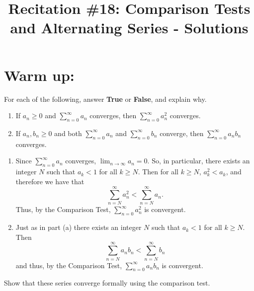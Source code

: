 \documentclass[noinstructornotes]{ximera}
\title{Recitation \#18: Comparison Tests and Alternating Series - Solutions}
\begin{document}
\begin{abstract}		\end{abstract}
\maketitle



\section{Warm up:}
For each of the following, answer {\bf True} or {\bf False}, and explain why.
	\begin{enumerate}
	
	\item  If $a_n \geq 0$ and $\sum_{n=0}^\infty a_n$ converges, then $\sum_{n=0}^\infty a_n^2$ converges.
	
	\item  If $a_n, b_n \geq 0$ and both $\sum_{n=0}^\infty a_n$ and $\sum_{n=0}^\infty b_n$ converge, then $\sum_{n=0}^\infty a_n b_n$ converges. 
	
	\end{enumerate}
	
	\begin{freeResponse}
		\begin{enumerate}
		
		\item  {}
		
		Since $\sum_{n=0}^\infty a_n$ converges, $\lim_{n \to \infty} a_n = 0$.  
		So, in particular, there exists an integer $N$ such that $a_k < 1$ for all $k \geq N$.  
		Then for all $k \geq N$, $a_k^2 < a_k$, and therefore we have that
			\[
			\sum_{n=N}^\infty a_n^2 < \sum_{n=N}^\infty a_n.
			\]
		Thus,  by the Comparison Test, $\sum_{n=0}^\infty a_n^2$ is convergent.
		
		
		
		\item  {}
		
		Just as in part (a) there exists an integer $N$ such that $a_k < 1$ for all $k \geq N$.  
		Then
			\[
			\sum_{n=N}^\infty a_n b_n < \sum_{n=N}^\infty b_n
			\]
		and thus, by the Comparison Test, $\sum_{n=0}^\infty a_n b_n$ is convergent.
		
		\end{enumerate}
	\end{freeResponse}
	
\begin{instructorNotes}
Show that these series converge formally using the comparison test.
\end{instructorNotes}
\end{document}
